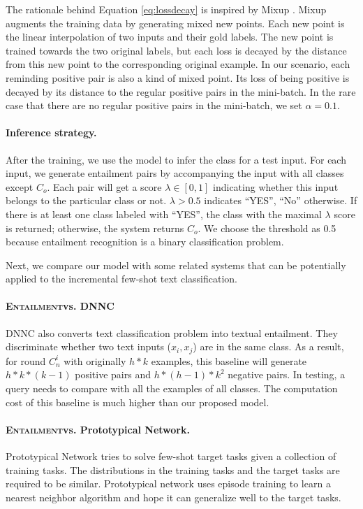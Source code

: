 \documentclass[11pt]{article}
\newcommand{\modelname}{\textsc{Entailment}}
\begin{document}
The rationale behind Equation \ref{eq:lossdecay} is inspired by Mixup \cite{DBLPZhangCDL18}. Mixup augments the training data by generating mixed new points. Each new point is the linear interpolation of two inputs and their gold labels. The new point is trained towards the two original labels, but each loss is decayed by the distance from this new point to the corresponding original example. In our scenario, each reminding positive pair is also a kind of mixed point. Its loss of being positive is decayed by its distance to the regular positive pairs in the mini-batch. In the rare case that there are no regular positive pairs in the mini-batch, we set $\alpha=0.1$.
\fi

\paragraph{Inference strategy.} After the training, we use the model to infer the class for a test input. For each input, we generate entailment pairs by accompanying the input with all classes except $C_o$. Each pair will get a score $\lambda \in [0, 1]$ indicating whether this input belongs to the particular class or not. $\lambda > 0.5$ indicates ``YES'', ``No'' otherwise. If there is at least one class labeled with ``YES'',  the class with the maximal $\lambda$ score is returned; otherwise, the system returns $C_o$. We choose the threshold as 0.5 because entailment recognition is a binary classification problem.

Next, we compare our model with some related systems that can be potentially applied to the incremental few-shot text classification.

\paragraph{\modelname\enspace vs. DNNC} DNNC \cite{zhangdiscriminative} also converts text classification problem into textual entailment. They discriminate whether two text inputs ($x_i, x_j$) are in the same class. 
As a result, for round $C_n^i$ with originally $h*k$ examples, this baseline will generate $h*k*(k-1)$ positive pairs and $h*(h-1)*k^2$ negative pairs. In testing, a query needs to compare with all the examples of all classes. The computation cost of this baseline is much higher than our proposed model.


\paragraph{\modelname\enspace vs. Prototypical Network.} Prototypical Network \cite{DBLPSnellSZ17} tries to solve few-shot target tasks given a collection of training tasks. The distributions in the training tasks and the target tasks are required to be similar. Prototypical network uses episode training to learn a nearest neighbor algorithm and hope it can generalize well to the target tasks. 
\end{document}
